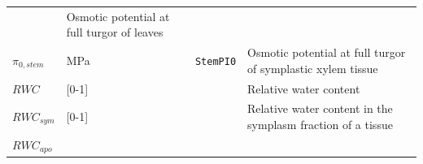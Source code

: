 \documentclass[]{book}
\begin{document}
\begin{longtable}[]{@{}llll@{}}
\begin{minipage}[t]{0.12\columnwidth}
\end{minipage} & \begin{minipage}[t]{0.45\columnwidth}\raggedright
Osmotic potential at full turgor of leaves\strut
\end{minipage}\tabularnewline
\begin{minipage}[t]{0.11\columnwidth}\raggedright
\(\pi_{0,stem}\)\strut
\end{minipage} & \begin{minipage}[t]{0.10\columnwidth}\raggedright
MPa\strut
\end{minipage} & \begin{minipage}[t]{0.12\columnwidth}\raggedright
\texttt{StemPI0}\strut
\end{minipage} & \begin{minipage}[t]{0.45\columnwidth}\raggedright
Osmotic potential at full turgor of symplastic xylem tissue\strut
\end{minipage}\tabularnewline
\begin{minipage}[t]{0.11\columnwidth}\raggedright
\(RWC\)\strut
\end{minipage} & \begin{minipage}[t]{0.10\columnwidth}\raggedright
{[}0-1{]}\strut
\end{minipage} & \begin{minipage}[t]{0.12\columnwidth}\raggedright
\strut
\end{minipage} & \begin{minipage}[t]{0.45\columnwidth}\raggedright
Relative water content\strut
\end{minipage}\tabularnewline
\begin{minipage}[t]{0.11\columnwidth}\raggedright
\(RWC_{sym}\)\strut
\end{minipage} & \begin{minipage}[t]{0.10\columnwidth}\raggedright
{[}0-1{]}\strut
\end{minipage} & \begin{minipage}[t]{0.12\columnwidth}\raggedright
\strut
\end{minipage} & \begin{minipage}[t]{0.45\columnwidth}\raggedright
Relative water content in the symplasm fraction of a tissue\strut
\end{minipage}\tabularnewline
\begin{minipage}[t]{0.11\columnwidth}\raggedright
\(RWC_{apo}\)\strut
\end{minipage} & \begin{minipage}[t]{0.10\columnwidth}\raggedright

\end{minipage}
\end{longtable}
\end{document}
